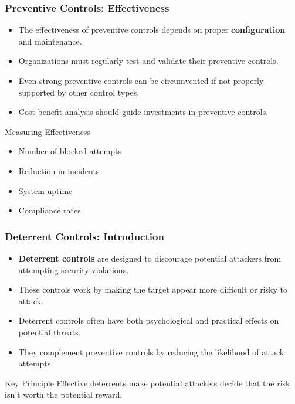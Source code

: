 \documentclass{beamer}
\begin{document}
\begin{frame}
    \frametitle{Preventive Controls: Effectiveness}
    
    \begin{itemize}
        \item The effectiveness of preventive controls depends on proper \textbf{configuration} and maintenance.
        
        \item Organizations must regularly test and validate their preventive controls.
        
        \item Even strong preventive controls can be circumvented if not properly supported by other control types.
        
        \item Cost-benefit analysis should guide investments in preventive controls.
    \end{itemize}
    
    \begin{block}{Measuring Effectiveness}
        \begin{itemize}
            \item Number of blocked attempts
            \item Reduction in incidents
            \item System uptime
            \item Compliance rates
        \end{itemize}
    \end{block}
\end{frame}

\begin{frame}
    \frametitle{Deterrent Controls: Introduction}
    
    \begin{itemize}
        \item \textbf{Deterrent controls} are designed to discourage potential attackers from attempting security violations.
        
        \item These controls work by making the target appear more difficult or risky to attack.
        
        \item Deterrent controls often have both psychological and practical effects on potential threats.
        
        \item They complement preventive controls by reducing the likelihood of attack attempts.
    \end{itemize}
    
    \begin{alertblock}{Key Principle}
        Effective deterrents make potential attackers decide that the risk isn't worth the potential reward.
    \end{alertblock}
\end{frame}
\end{document}
